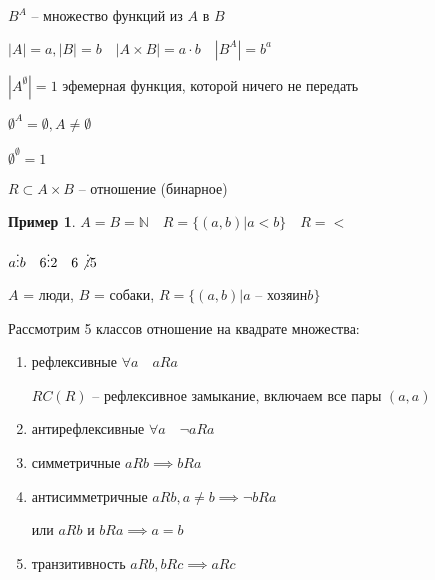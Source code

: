 \documentclass{book}
\newcommand\N{\ensuremath{\mathbb{N}}}
\renewcommand\O{\ensuremath{\emptyset}}
\theoremstyle{definition}
\newtheorem*{example}{Пример}
\begin{document}
        $B^A$ -- множество функций из $A$ в $B$

        $|A| = a, |B| = b\quad |A\times B| = a\cdot b\quad |B^A| = b^a$

        $|A^{\O }| = 1$ эфемерная функция, которой ничего не передать

        $\O ^A = \O , A \neq \O $

        $\O ^{\O } = 1$
       
        \begin{definition}
            $R\subset A\times B$ -- отношение (бинарное)

        \end{definition}
        \begin{example}
            $A=B=\N \quad R = \{(a,b)|a<b\}\quad R= <$

            $a\vdots b\quad 6\vdots 2\quad 6\not\vdots 5$

            $A$ = люди, $B$ = собаки, $R = \{(a,b)|a\text{ -- хозяин} b\}$
        \end{example}

        Рассмотрим 5 классов отношение на квадрате множества:
        \begin{enumerate}
            \item рефлексивные $\forall a \quad aRa$

                $RC(R)$ -- рефлексивное замыкание, включаем все пары $(a,a)$
            \item антирефлексивные $\forall a \quad \neg aRa$
            \item симметричные $aRb \implies bRa$
            \item антисимметричные $aRb, a\neq b \implies \neg bRa$

                или $aRb$ и $bRa \implies a=b$
            \item транзитивность $aRb, bRc \implies  aRc$
        \end{enumerate}
        
\end{document}
